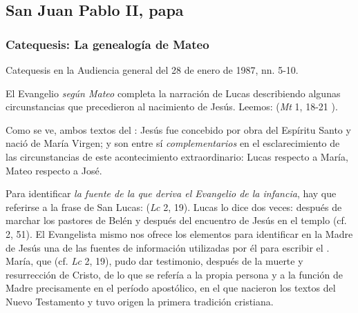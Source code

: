 \subsection{San Juan Pablo II, papa}

\subsubsection{Catequesis: La genealogía de Mateo}

Catequesis en la Audiencia general del 28 de enero de 1987, nn. 5-10.

El Evangelio \emph{según Mateo} completa la narración de Lucas describiendo algunas circunstancias que precedieron al nacimiento de Jesús. Leemos:  (\emph{Mt} 1, 18-21 ).

Como se ve, ambos textos del : Jesús fue concebido por obra del Espíritu Santo y nació de María Virgen; y son entre sí \emph{complementarios} en el esclarecimiento de las circunstancias de este acontecimiento extraordinario: Lucas respecto a María, Mateo respecto a José.

Para identificar \emph{la fuente de la que deriva el Evangelio de la infancia}, hay que referirse a la frase de San Lucas:  (\emph{Lc} 2, 19). Lucas lo dice dos veces: después de marchar los pastores de Belén y después del encuentro de Jesús en el templo (cf. 2, 51). El Evangelista mismo nos ofrece los elementos para identificar en la Madre de Jesús una de las fuentes de información utilizadas por él para escribir el . María, que  (cf. \emph{Lc} 2, 19), pudo dar testimonio, después de la muerte y resurrección de Cristo, de lo que se refería a la propia persona y a la función de Madre precisamente en el período apostólico, en el que nacieron los textos del Nuevo Testamento y tuvo origen la primera tradición cristiana.

